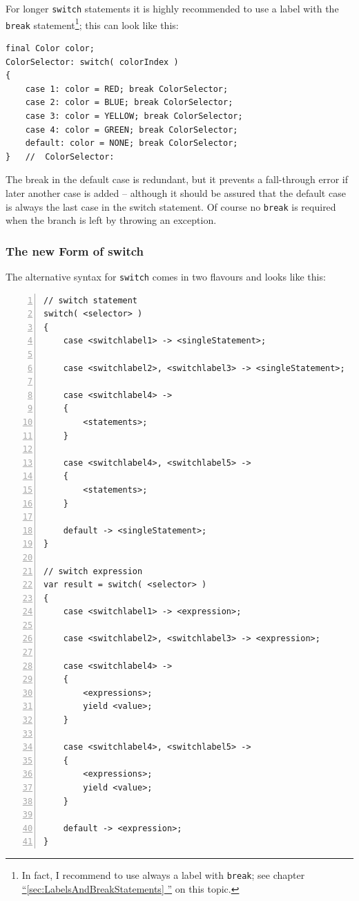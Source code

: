 \documentclass[12pt,a4paper,titlepage, parskip=half, headsepline, footsepline, cleardoubleplain]{scrbook}
\newcommand*{\tqfullref}[1]{\hyperref[{#1}]{“\ref*{#1} \nameref*{#1}”}}
\begin{document}
For longer \lstinline|switch| statements it is highly recommended to use a label with the \lstinline|break| statement\footnote{In fact, I recommend to use always a label with \lstinline|break|; see chapter \tqfullref{sec:LabelsAndBreakStatements} on this topic.}; this can look like this:
\begin{lstlisting}
final Color color;
ColorSelector: switch( colorIndex )
{
    case 1: color = RED; break ColorSelector;
    case 2: color = BLUE; break ColorSelector;
    case 3: color = YELLOW; break ColorSelector;
    case 4: color = GREEN; break ColorSelector;
    default: color = NONE; break ColorSelector;
}   //  ColorSelector:
\end{lstlisting}

The break in the default case is redundant, but it prevents a fall-through error if later another case is added – although it should be assured that the default case is always the last case in the switch statement. Of course no \lstinline|break| is required when the branch is left by throwing an exception.

\subsubsection{The new Form of switch}
The alternative syntax for \lstinline|switch| comes in two flavours and looks like this:

\begin{lstlisting}[numbers=left]
// switch statement
switch( <selector> )
{
    case <switchlabel1> -> <singleStatement>;

    case <switchlabel2>, <switchlabel3> -> <singleStatement>;

    case <switchlabel4> ->
    {
        <statements>;
    }

    case <switchlabel4>, <switchlabel5> ->
    {
        <statements>;
    }

    default -> <singleStatement>;
}

// switch expression
var result = switch( <selector> )
{
    case <switchlabel1> -> <expression>;

    case <switchlabel2>, <switchlabel3> -> <expression>;

    case <switchlabel4> ->
    {
        <expressions>;
        yield <value>;
    }

    case <switchlabel4>, <switchlabel5> ->
    {
        <expressions>;
        yield <value>;
    }

    default -> <expression>;
}
\end{lstlisting}
\end{document}
